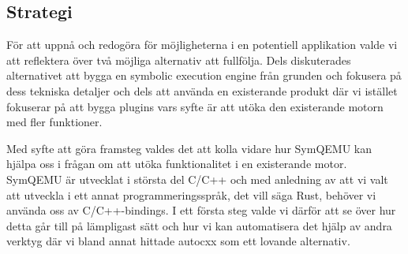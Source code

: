 \subsection{Strategi}
För att uppnå och redogöra för möjligheterna i en potentiell applikation valde vi att reflektera över två möjliga 
alternativ att fullfölja. Dels diskuterades alternativet att bygga en symbolic execution engine från grunden och fokusera på
dess tekniska detaljer och dels att använda en existerande produkt där vi istället fokuserar på att bygga plugins vars
syfte är att utöka den existerande motorn med fler funktioner. 

Med syfte att göra framsteg valdes det att kolla vidare hur SymQEMU kan hjälpa oss i frågan om att utöka funktionalitet
i en existerande motor. SymQEMU är utvecklat i största del C/C++ och med anledning av att vi valt att utveckla i ett annat
programmeringsspråk, det vill säga Rust, behöver vi använda oss av C/C++-bindings. I ett första steg valde vi därför att 
se över hur detta går till på lämpligast sätt och hur vi kan automatisera det hjälp av andra verktyg där vi bland annat hittade
autocxx som ett lovande alternativ. 



